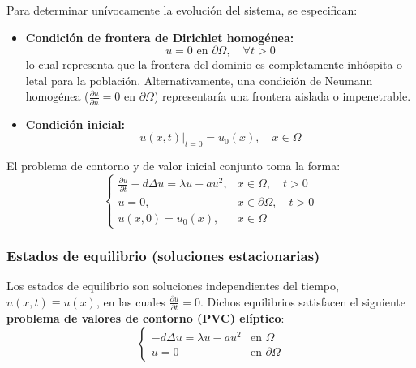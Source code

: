 \begin{center}
\end{center}

Para determinar unívocamente la evolución del sistema, se especifican:
\begin{itemize}
    \item \textbf{Condición de frontera de Dirichlet homogénea:}
    \[
        u = 0 \text{ en } \partial \Omega, \quad \forall t > 0
    \]
    lo cual representa que la frontera del dominio es completamente inhóspita o letal para la población. Alternativamente, una condición de Neumann homogénea ($\frac{\partial u}{\partial n} = 0$ en $\partial \Omega$) representaría una frontera aislada o impenetrable.
    \item \textbf{Condición inicial:}
    \[
        u(x, t)\big|_{t = 0} = u_0(x), \quad x \in \Omega
    \]
\end{itemize}

El problema de contorno y de valor inicial conjunto toma la forma:
\[
    \begin{cases}
        \frac{\partial u}{\partial t} - d \Delta u = \lambda u - a u^2, & x \in \Omega, \quad t > 0 \\
        u = 0, & x \in \partial \Omega, \quad t > 0 \\
        u(x, 0) = u_0(x), & x \in \Omega
    \end{cases}
\]

\subsubsection{Estados de equilibrio (soluciones estacionarias)}

Los estados de equilibrio son soluciones independientes del tiempo, $u(x, t) \equiv u(x)$, en las cuales $\frac{\partial u}{\partial t} = 0$. Dichos equilibrios satisfacen el siguiente \textbf{problema de valores de contorno (PVC) elíptico}:
\[
    \begin{cases}
        -d \Delta u = \lambda u - a u^2 & \text{en } \Omega \\
        u = 0 & \text{en } \partial \Omega
    \end{cases}
\]

